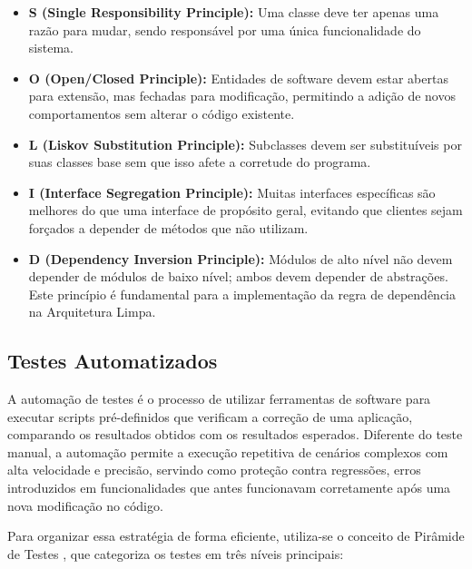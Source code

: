 \documentclass[article,a4paper,12pt,brazil,sumario=tradicional]{abntex2}
\begin{document}
\begin{itemize}
    \item \textbf{S (Single Responsibility Principle):} Uma classe deve ter apenas uma razão para mudar, sendo responsável por uma única funcionalidade do sistema.
    \item \textbf{O (Open/Closed Principle):} Entidades de software devem estar abertas para extensão, mas fechadas para modificação, permitindo a adição de novos comportamentos sem alterar o código existente.
    \item \textbf{L (Liskov Substitution Principle):} Subclasses devem ser substituíveis por suas classes base sem que isso afete a corretude do programa.
    \item \textbf{I (Interface Segregation Principle):} Muitas interfaces específicas são melhores do que uma interface de propósito geral, evitando que clientes sejam forçados a depender de métodos que não utilizam.
    \item \textbf{D (Dependency Inversion Principle):} Módulos de alto nível não devem depender de módulos de baixo nível; ambos devem depender de abstrações. Este princípio é fundamental para a implementação da regra de dependência na Arquitetura Limpa.
\end{itemize}


\subsection{Testes Automatizados}

A automação de testes é o processo de utilizar ferramentas de software para executar scripts pré-definidos que verificam a correção de uma aplicação, comparando os resultados obtidos com os resultados esperados. Diferente do teste manual, a automação permite a execução repetitiva de cenários complexos com alta velocidade e precisão, servindo como proteção contra regressões, erros introduzidos em funcionalidades que antes funcionavam corretamente após uma nova modificação no código.

Para organizar essa estratégia de forma eficiente, utiliza-se o conceito de Pirâmide de Testes \cite{fowler2012testpyramid}, que categoriza os testes em três níveis principais:
\end{document}
